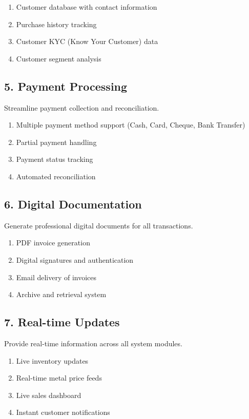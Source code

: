 \documentclass[12pt,a4paper]{report}
\begin{document}
\begin{enumerate}[label=\roman*)]
    \item Customer database with contact information
    \item Purchase history tracking
    \item Customer KYC (Know Your Customer) data
    \item Customer segment analysis
\end{enumerate}

\subsection{5. Payment Processing}

Streamline payment collection and reconciliation.

\begin{enumerate}[label=\roman*)]
    \item Multiple payment method support (Cash, Card, Cheque, Bank Transfer)
    \item Partial payment handling
    \item Payment status tracking
    \item Automated reconciliation
\end{enumerate}

\subsection{6. Digital Documentation}

Generate professional digital documents for all transactions.

\begin{enumerate}[label=\roman*)]
    \item PDF invoice generation
    \item Digital signatures and authentication
    \item Email delivery of invoices
    \item Archive and retrieval system
\end{enumerate}

\subsection{7. Real-time Updates}

Provide real-time information across all system modules.

\begin{enumerate}[label=\roman*)]
    \item Live inventory updates
    \item Real-time metal price feeds
    \item Live sales dashboard
    \item Instant customer notifications
\end{enumerate}
\end{document}
